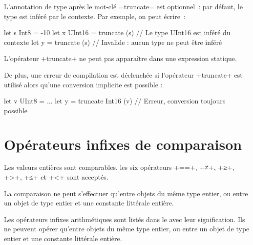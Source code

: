 L'annotation de type après le mot-clé \omnibus=truncate= est optionnel~: par défaut, le type est inféré par le contexte. Par exemple, on peut écrire~:
\begin{OMNIBUS}
let s Int8 = -10
let x UInt16 = truncate (s) // Le type UInt16 est inféré du contexte
let y = truncate (s) // Invalide : aucun type ne peut être inféré
\end{OMNIBUS}


L'opérateur \omnibus+truncate+ ne peut pas apparaître dans une expression statique.

De plus, une erreur de compilation est déclenchée si l'opérateur \omnibus+truncate+ est utilisé alors qu'une conversion implicite est possible :
\begin{OMNIBUS}
let v UInt8 = ...
let y = truncate Int16 (v) // Erreur, conversion toujours possible
\end{OMNIBUS}

\section{Opérateurs infixes de comparaison}

Les valeurs entières sont comparables, les six opérateurs \omnibus+==+, \omnibus+≠+, \omnibus+≥+, \omnibus+>+, \omnibus+≤+ et \omnibus+<+ sont acceptés.

La comparaison ne peut s'effectuer qu'entre objets du même type entier, ou entre un objet de type entier et une constante littérale entière.











Les opérateurs infixes arithmétiques sont listés dans le  avec leur signification. Ils ne peuvent opérer qu'entre objets du même type entier, ou entre un objet de type entier et une constante littérale entière.



